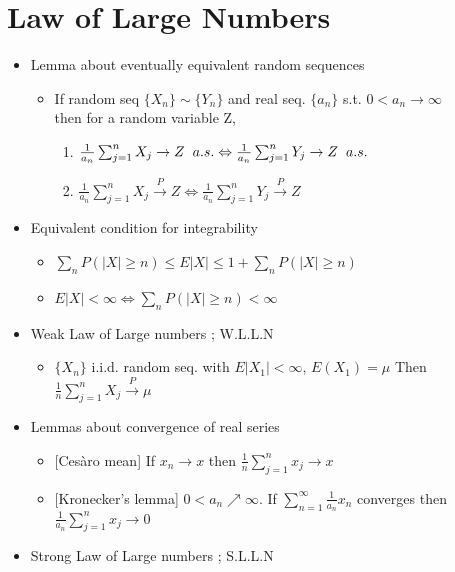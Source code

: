 \documentclass[12pt, A4]{article}
\begin{document}
\section{Law of Large Numbers}
\begin{itemize}
	\item Lemma about eventually equivalent random sequences
	\begin{itemize}
		\item If random seq $\{X_n\}\sim\{Y_n\}$ and real seq. $\{a_n\}$ 
		s.t. $0<a_n\rightarrow\infty$ \\then for a random variable Z,
		\begin{enumerate}
			\item $\frac{1}{a_n}\sum_{j=1}^nX_j\rightarrow Z \hspace{0.2cm} a.s. \Leftrightarrow \frac{1}{a_n}\sum_{j=1}^nY_j\rightarrow Z \hspace{0.2cm} a.s.$
			\item $\frac{1}{a_n}\sum_{j=1}^nX_j\xrightarrow{P} Z \Leftrightarrow \frac{1}{a_n}\sum_{j=1}^nY_j\xrightarrow{P} Z$
		\end{enumerate}
	\end{itemize}
	\item Equivalent condition for integrability
	\begin{itemize}
		\item $\sum_n P(|X|\geq n)\leq E|X|\leq 1+ \sum_n P(|X|\geq n)$
		\item $E|X|<\infty \Leftrightarrow \sum_n P(|X|\geq n)<\infty$
	\end{itemize}
	\item Weak Law of Large numbers ; W.L.L.N
	\begin{itemize}
		\item $\{X_n\}$ i.i.d. random seq. with $E|X_1|<\infty$, $E(X_1)=\mu$ 
		 Then $\frac{1}{n}\sum_{j=1}^nX_j\xrightarrow{P}\mu$
	\end{itemize}
	\item Lemmas about convergence of real series
	\begin{itemize}
		\item {[Ces\`{a}ro mean]} If $x_n\rightarrow x $ then $\frac{1}{n}\sum_{j=1}^nx_j\rightarrow x$
		\item {[Kronecker's lemma]} $0<a_n\nearrow\infty$. If $\sum_{n=1}^{\infty} \frac{1}{a_n}x_n$ converges then $\frac{1}{a_n}\sum_{j=1}^nx_j \rightarrow 0 $
	\end{itemize}
	\item Strong Law of Large numbers ; S.L.L.N

\end{itemize}
\end{document}
